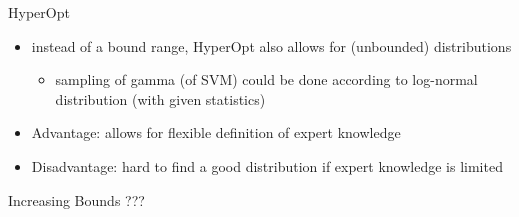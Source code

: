 \begin{frame}[c]{HyperOpt}

\begin{itemize}
  \item instead of a bound range, HyperOpt also allows for (unbounded) distributions
  \begin{itemize}
    \item sampling of gamma (of SVM) could be done according to log-normal distribution (with given statistics) 
  \end{itemize}
  \item Advantage: allows for flexible definition of expert knowledge
  \item Disadvantage: hard to find a good distribution if expert knowledge is limited
\end{itemize}


\end{frame}
\begin{frame}[c]{Increasing Bounds {???}}


\end{frame}
